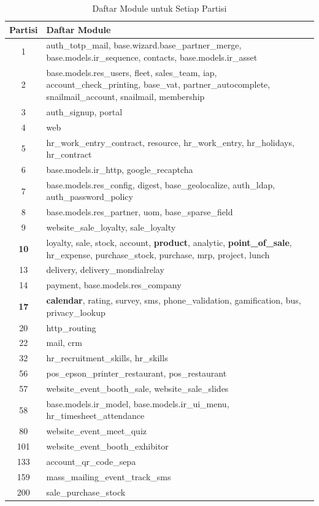 \begingroup
\setlength{\LTleft}{-20cm plus -1fill}
\setlength{\LTright}{\LTleft}
\begin{small}
	\begin{longtable}{|c|p{14cm}|}
		\caption{Daftar Module untuk Setiap Partisi}
		\label{tab:daftar_module_final}\\
		\hline
		\textbf{Partisi} & \textbf{Daftar Module}
		\\
		\endfirsthead
		\hline  
		1 & auth{\_}totp{\_}mail, base.wizard.base{\_}partner{\_}merge, base.models.ir{\_}sequence, contacts, base.models.ir{\_}asset \\ \hline
		2 & base.models.res{\_}users, fleet, sales{\_}team, iap, account{\_}check{\_}printing, base{\_}vat, partner{\_}autocomplete, snailmail{\_}account, snailmail, membership \\ \hline
		3 & auth{\_}signup, portal \\ \hline
		4 & web \\ \hline
		5 & hr{\_}work{\_}entry{\_}contract, resource, hr{\_}work{\_}entry, hr{\_}holidays, hr{\_}contract \\ \hline
		6 & base.models.ir{\_}http, google{\_}recaptcha \\ \hline
		7 & base.models.res{\_}config, digest, base{\_}geolocalize, auth{\_}ldap, auth{\_}password{\_}policy \\ \hline
		8 & base.models.res{\_}partner, uom, base{\_}sparse{\_}field \\ \hline
		9 & website{\_}sale{\_}loyalty, sale{\_}loyalty \\ \hline
		\textbf{10} & loyalty, sale, stock, account, \textbf{product}, analytic, \textbf{point{\_}of{\_}sale}, hr{\_}expense, purchase{\_}stock, purchase, mrp, project, lunch \\ \hline
		13 & delivery, delivery{\_}mondialrelay \\ \hline
		14 & payment, base.models.res{\_}company \\ \hline
		\textbf{17} & \textbf{calendar}, rating, survey, sms, phone{\_}validation, gamification, bus, privacy{\_}lookup \\ \hline
		20 & http{\_}routing \\ \hline
		22 & mail, crm \\ \hline
		32 & hr{\_}recruitment{\_}skills, hr{\_}skills \\ \hline
		56 & pos{\_}epson{\_}printer{\_}restaurant, pos{\_}restaurant \\ \hline
		57 & website{\_}event{\_}booth{\_}sale, website{\_}sale{\_}slides \\ \hline
		58 & base.models.ir{\_}model, base.models.ir{\_}ui{\_}menu, hr{\_}timesheet{\_}attendance \\ \hline
		80 & website{\_}event{\_}meet{\_}quiz \\ \hline
		101 & website{\_}event{\_}booth{\_}exhibitor \\ \hline
		133 & account{\_}qr{\_}code{\_}sepa \\ \hline
		159 & mass{\_}mailing{\_}event{\_}track{\_}sms \\ \hline
		200 & sale{\_}purchase{\_}stock \\ \hline
	\end{longtable}
\end{small}
